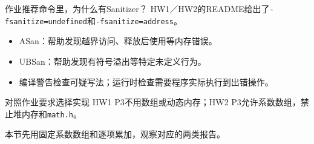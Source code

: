 \begin{frame}{作业推荐命令里，为什么有Sanitizer？}
    HW1／HW2的README给出了\texttt{-fsanitize=undefined}和\texttt{-fsanitize=address}。
    \begin{itemize}
        \item \alert{ASan}：帮助发现越界访问、释放后使用等内存错误。
        \item \alert{UBSan}：帮助发现有符号溢出等特定未定义行为。
        \item \alert{编译警告}检查可疑写法；运行时检查需要程序实际执行到出错操作。
    \end{itemize}
    \medskip
    \begin{vspquotered}{对照作业要求选择实现}
        HW1 P3不用数组或动态内存；HW2 P3允许系数数组，禁止堆内存和\texttt{math.h}。\par
        本节先用固定系数数组和逐项累加，观察对应的两类报告。
    \end{vspquotered}
\end{frame}

